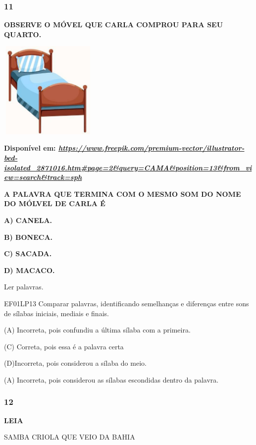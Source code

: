 \subsubsection{11}\label{section-67}

\textbf{OBSERVE O MÓVEL QUE CARLA COMPROU PARA SEU QUARTO.}

\includegraphics[width=1.84783in,height=1.84783in]{media/image235.jpg}

\textbf{Disponível em:
\href{https://www.freepik.com/premium-vector/illustrator-bed-isolated_2871016.htm\#page=2\&query=CAMA\&position=13\&from_view=search\&track=sph}{\emph{https://www.freepik.com/premium-vector/illustrator-bed-isolated\_2871016.htm\#page=2\&query=CAMA\&position=13\&from\_view=search\&track=sph}}}

\textbf{A PALAVRA QUE TERMINA COM O MESMO SOM DO NOME DO MÓLVEL DE CARLA
É}

\textbf{A) CANELA.}

\textbf{B) BONECA.}

\textbf{C) SACADA.}

\textbf{D) MACACO.}

Ler palavras.

EF01LP13 Comparar palavras, identificando semelhanças e diferenças entre
sons de sílabas iniciais, mediais e finais.

(A) Incorreta, pois confundiu a última sílaba com a primeira.

(C) Correta, pois essa é a palavra certa

(D)Incorreta, pois considerou a sílaba do meio.

(A) Incorreta, pois considerou as sílabas escondidas dentro da palavra.

\subsubsection{12}\label{section-68}

\textbf{LEIA}

SAMBA CRIOLA QUE VEIO DA BAHIA


